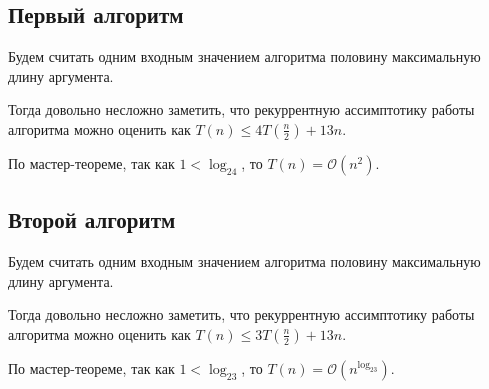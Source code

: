 \section{}
\label{sec:5}
	\subsection{Первый алгоритм}
		Будем считать одним входным значением алгоритма половину максимальную длину аргумента.
		
		Тогда довольно несложно заметить, что рекуррентную ассимптотику работы алгоритма можно оценить как $T(n) \leq 4T(\frac{n}{2}) + 13n$.
		
		По мастер-теореме, так как $1 < \log_24$, то $T(n) = \mathcal{O}(n^2)$.
		
	\subsection{Второй алгоритм} 
		Будем считать одним входным значением алгоритма половину максимальную длину аргумента.
		
		Тогда довольно несложно заметить, что рекуррентную ассимптотику работы алгоритма можно оценить как $T(n) \leq 3T(\frac{n}{2}) + 13n$.
		
		По мастер-теореме, так как $1 < \log_23$, то $T(n) = \mathcal{O}(n^{\log_23})$.